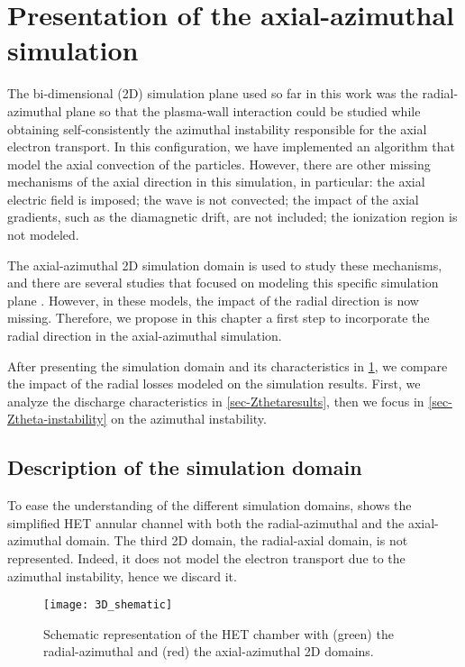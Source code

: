 
\section{Presentation of the axial-azimuthal simulation}
\label{sec-ztheta_description}
The bi-dimensional (\acs{2D}) simulation plane used so far in this work was the radial-azimuthal plane so that the plasma-wall interaction could be studied while obtaining self-consistently the azimuthal instability responsible for the axial electron transport.
In this configuration, we have implemented an algorithm that model the axial convection of the particles.
However, there are other missing mechanisms of the axial direction in this simulation, in particular\string: the axial electric field is imposed\string; the wave is not convected\string; the impact of the axial gradients, such as the diamagnetic drift, are not included\string; the ionization region is not modeled.

The axial-azimuthal \ac{2D} simulation domain is used to study these mechanisms, and there are several studies that focused on modeling this specific simulation plane \citep{adam2004,coche2014,boeuf2018,taccogna2019}.
However, in these models, the impact of the radial direction is now missing.
Therefore, we propose in this chapter a first step to incorporate the radial direction in the axial-azimuthal simulation.

After presenting the simulation domain and its characteristics in \cref{sec-ztheta_description}, we compare the impact of the radial losses modeled on the simulation results.
First, we analyze the discharge characteristics in \cref{sec-Zthetaresults}, then we focus in \cref{sec-Ztheta-instability} on the azimuthal instability.


\subsection{Description of the simulation domain} \label{subsec-ztheta_description}
To ease the understanding of the different simulation domains,  shows the simplified \ac{HET} annular channel with both the radial-azimuthal and the axial-azimuthal \ztheta domain.
The third \ac{2D} domain, the radial-axial domain, is not represented.
Indeed, it does not model the electron transport due to the azimuthal instability, hence we discard it.

\begin{figure}[hbt]
  \centering
  \texttt{[image: 3D\_shematic]}
  \caption{Schematic representation of the \acs{HET} chamber with (green) the radial-azimuthal and (red) the axial-azimuthal 2D domains.}
  \label{fig-3Dschematic}
\end{figure}

